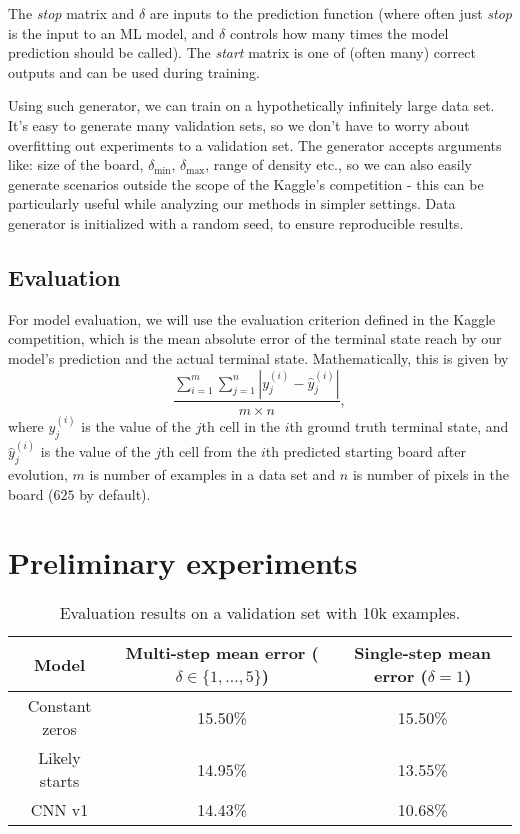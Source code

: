\documentclass[conference]{IEEEtran}
\begin{document}
The {\it stop} matrix and $\delta$ are inputs to the prediction function (where often just {\it stop} is the input to an ML model, and $\delta$ controls how many times the model prediction should be called). The {\it start} matrix is one of (often many) correct outputs and can be used during training.

Using such generator, we can train on a hypothetically infinitely large data set. It's easy to generate many validation sets, so we don't have to worry about overfitting out experiments to a validation set. The generator accepts arguments like: size of the board, $\delta_{\min}$, $\delta_{\max}$, range of density etc., so we can also easily generate scenarios outside the scope of the Kaggle's competition - this can be particularly useful while analyzing our methods in simpler settings. Data generator is initialized with a random seed, to ensure reproducible results.

\subsection{Evaluation}
For model evaluation, we will use the evaluation criterion defined in the Kaggle competition, which is the mean absolute error of the terminal state reach by our model's prediction and the actual terminal state. Mathematically, this is given by $$\frac{\sum_{i=1}^{m}\sum_{j=1}^{n}|y_{j}^{(i)} - \hat y_{j}^{(i)}|}{m \times n},$$ where $y_{j}^{(i)}$ is the value of the $j$th cell in the $i$th ground truth terminal state, and $\hat y_{j}^{(i)}$ is the value of the $j$th cell from the $i$th predicted starting board after evolution, $m$ is number of examples in a data set and $n$ is number of pixels in the board ($625$ by default).

\section{Preliminary experiments}

\begin{table}[]
    \centering
    \begin{tabular}{|c|c|c|}
    \hline
    Model & Multi-step mean error ($\delta \in \{1,\dots,5\}$)  & Single-step mean error ($\delta = 1$) \\
    \hline
    Constant zeros & 15.50\% & 15.50\% \\
    Likely starts & 14.95\% & 13.55\% \\
    CNN v1 & 14.43\% & 10.68\% \\
    \hline
    \end{tabular}
    \caption{Evaluation results on a validation set with 10k examples.}
    \label{tab:eval_results}
\end{table}
\end{document}
